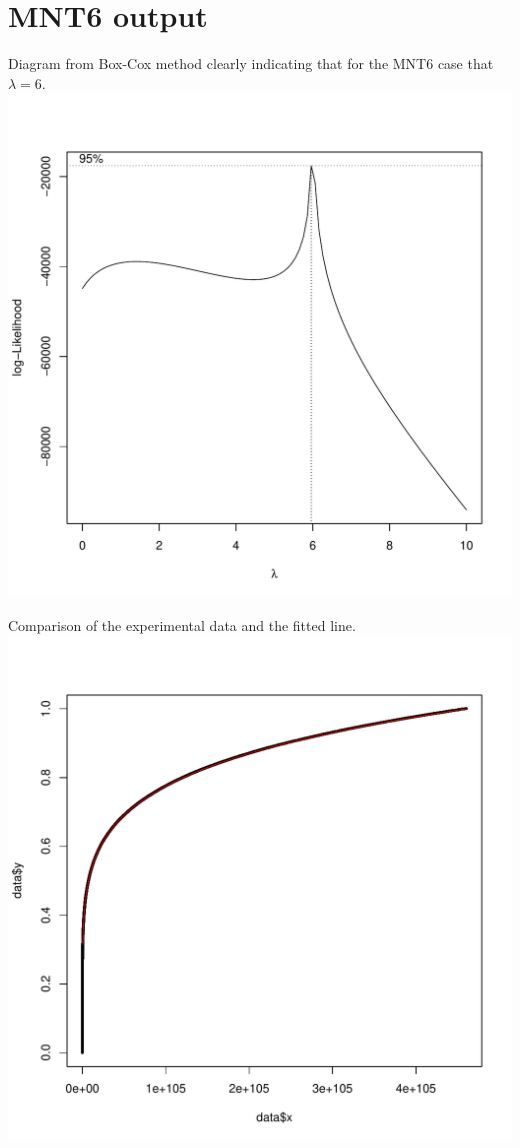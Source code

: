\documentclass[a4paper, 10pt, envcountsect, runningheads]{lms}
\numberwithin{figure}{section}
\numberwithin{equation}{section}
\begin{document}
\section{MNT6 output}\label{A:MNT6_output}
Diagram from Box-Cox method clearly indicating that for the MNT6 case that $\lambda=6$.\\
\includegraphics[scale=0.7]{graphs/CheckLineFit2}\label{fig:boxcox}

Comparison of the experimental data and the fitted line.\\
\includegraphics[scale=0.65]{graphs/CheckLineFit4}\label{fig:linefit}
\end{document}
